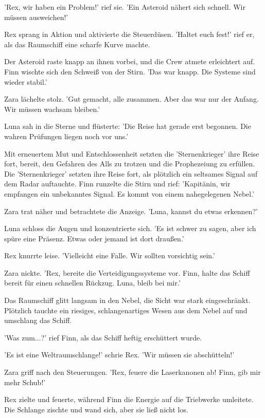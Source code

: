 \documentclass[12pt]{article}
\begin{document}
'Rex, wir haben ein Problem!' rief sie. 'Ein Asteroid nähert sich schnell. Wir müssen ausweichen!'

Rex sprang in Aktion und aktivierte die Steuerdüsen. 'Haltet euch fest!' rief er, als das Raumschiff eine scharfe Kurve machte.

Der Asteroid raste knapp an ihnen vorbei, und die Crew atmete erleichtert auf. Finn wischte sich den Schweiß von der Stirn. 'Das war knapp. Die Systeme sind wieder stabil.'

Zara lächelte stolz. 'Gut gemacht, alle zusammen. Aber das war nur der Anfang. Wir müssen wachsam bleiben.'

Luna sah in die Sterne und flüsterte: 'Die Reise hat gerade erst begonnen. Die wahren Prüfungen liegen noch vor uns.'

Mit erneuertem Mut und Entschlossenheit setzten die 'Sternenkrieger' ihre Reise fort, bereit, den Gefahren des Alls zu trotzen und die Prophezeiung zu erfüllen. Die 'Sternenkrieger' setzten ihre Reise fort, als plötzlich ein seltsames Signal auf dem Radar auftauchte. Finn runzelte die Stirn und rief: 'Kapitänin, wir empfangen ein unbekanntes Signal. Es kommt von einem nahegelegenen Nebel.'

Zara trat näher und betrachtete die Anzeige. 'Luna, kannst du etwas erkennen?'

Luna schloss die Augen und konzentrierte sich. 'Es ist schwer zu sagen, aber ich spüre eine Präsenz. Etwas oder jemand ist dort draußen.'

Rex knurrte leise. 'Vielleicht eine Falle. Wir sollten vorsichtig sein.'

Zara nickte. 'Rex, bereite die Verteidigungssysteme vor. Finn, halte das Schiff bereit für einen schnellen Rückzug. Luna, bleib bei mir.'

Das Raumschiff glitt langsam in den Nebel, die Sicht war stark eingeschränkt. Plötzlich tauchte ein riesiges, schlangenartiges Wesen aus dem Nebel auf und umschlang das Schiff.

'Was zum...?' rief Finn, als das Schiff heftig erschüttert wurde.

'Es ist eine Weltraumschlange!' schrie Rex. 'Wir müssen sie abschütteln!'

Zara griff nach den Steuerungen. 'Rex, feuere die Laserkanonen ab! Finn, gib mir mehr Schub!'

Rex zielte und feuerte, während Finn die Energie auf die Triebwerke umleitete. Die Schlange zischte und wand sich, aber sie ließ nicht los.
\end{document}
